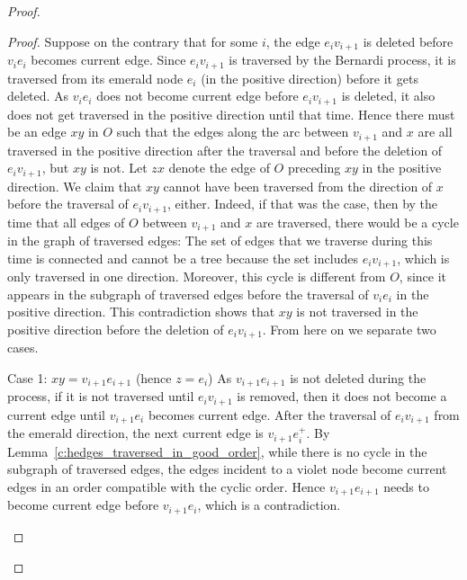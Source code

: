 \documentclass[ALCO,ThmDefs,Unicode,epreuves]{cedram}
\begin{document}
\begin{proof}
\begin{proof}
Suppose on the contrary that for some $i$, the edge $e_iv_{i+1}$ is deleted before $v_ie_i$ becomes current edge. Since $e_iv_{i+1}$ is traversed by the Bernardi process, it is traversed from its emerald node $e_i$ (\ie in the positive direction) before it gets deleted. As $v_ie_i$ does not become current edge before $e_iv_{i+1}$ is deleted, it also does not get traversed in the positive direction until that time. Hence there must be an edge $xy$ in $O$ such that the edges along the arc between $v_{i+1}$ and $x$ are all traversed in the positive direction after the traversal and 
before the deletion of $e_iv_{i+1}$, but $xy$ is not. Let $zx$ denote the edge of $O$ preceding $xy$ in the positive direction. We claim that $xy$ cannot have been traversed from the direction of $x$ before the traversal of $e_iv_{i+1}$, either. Indeed, if that was the case, then by the time that all edges of $O$ between $v_{i+1}$ and $x$ are traversed, there would be a cycle in the graph of traversed edges: The set of edges that we traverse during this time is connected and cannot be a tree because the set includes $e_iv_{i+1}$, which is only traversed in one direction. Moreover, this cycle is different from $O$, since it appears in the subgraph of traversed edges before the traversal of $v_ie_i$ in the positive direction. This contradiction shows that $xy$ is not traversed in the positive direction before the deletion of $e_iv_{i+1}$. From here on we separate two cases.

\begin{enonce*}[remark]{Case 1: $xy=v_{i+1}e_{i+1}$ (hence $z=e_i$)}
As $v_{i+1}e_{i+1}$ is not deleted during the process, if it is not traversed until $e_iv_{i+1}$ is removed, then it does not become a current edge until $v_{i+1}e_i$ becomes current edge. After the traversal of $e_iv_{i+1}$ from the emerald direction, the next current edge is $v_{i+1}e_i^+$. By Lemma~\ref{c:hedges_traversed_in_good_order}, while there is no cycle in the subgraph of traversed edges, the edges incident to a violet node become current edges in an order compatible with the cyclic order. Hence $v_{i+1}e_{i+1}$ needs to become current edge before $v_{i+1}e_i$, which is a contradiction.
\end{enonce*}


\end{proof}
\end{proof}
\end{document}
